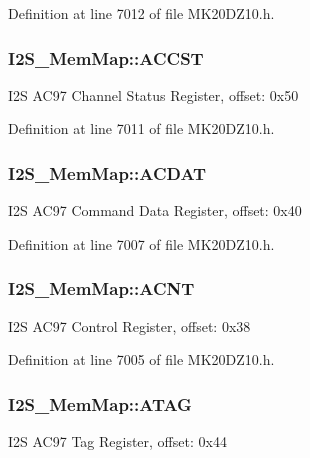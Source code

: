 Definition at line 7012 of file M\+K20\+D\+Z10.\+h.

\subsubsection[{\texorpdfstring{A\+C\+C\+ST}{ACCST}}]{ I2\+S\+\_\+\+Mem\+Map\+::\+A\+C\+C\+ST}\hypertarget{struct_i2_s___mem_map_a9673421e61891429c16da487744ed0b1}{}\label{struct_i2_s___mem_map_a9673421e61891429c16da487744ed0b1}
I2S A\+C97 Channel Status Register, offset\+: 0x50 

Definition at line 7011 of file M\+K20\+D\+Z10.\+h.

\subsubsection[{\texorpdfstring{A\+C\+D\+AT}{ACDAT}}]{ I2\+S\+\_\+\+Mem\+Map\+::\+A\+C\+D\+AT}\hypertarget{struct_i2_s___mem_map_ad4c68be32005658a1ed31a473cc87885}{}\label{struct_i2_s___mem_map_ad4c68be32005658a1ed31a473cc87885}
I2S A\+C97 Command Data Register, offset\+: 0x40 

Definition at line 7007 of file M\+K20\+D\+Z10.\+h.

\subsubsection[{\texorpdfstring{A\+C\+NT}{ACNT}}]{ I2\+S\+\_\+\+Mem\+Map\+::\+A\+C\+NT}\hypertarget{struct_i2_s___mem_map_a85705605cd5df8b8f4a76c474d44f640}{}\label{struct_i2_s___mem_map_a85705605cd5df8b8f4a76c474d44f640}
I2S A\+C97 Control Register, offset\+: 0x38 

Definition at line 7005 of file M\+K20\+D\+Z10.\+h.

\subsubsection[{\texorpdfstring{A\+T\+AG}{ATAG}}]{ I2\+S\+\_\+\+Mem\+Map\+::\+A\+T\+AG}\hypertarget{struct_i2_s___mem_map_a1aa86b0508318a9bd7dbb39e9c69abba}{}\label{struct_i2_s___mem_map_a1aa86b0508318a9bd7dbb39e9c69abba}
I2S A\+C97 Tag Register, offset\+: 0x44 

